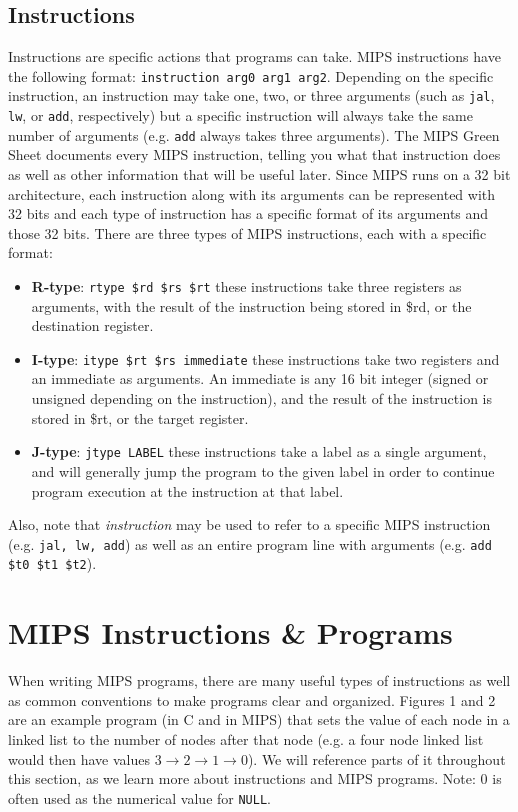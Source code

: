 \documentclass{article}
\begin{document}
\subsection{Instructions}
Instructions are specific actions that programs can take. MIPS instructions have the following format: \texttt{instruction arg0 arg1 arg2}. Depending on the specific instruction, an instruction may take one, two, or three arguments (such as \texttt{jal},  \texttt{lw}, or \texttt{add}, respectively) but a specific instruction will always take the same number of arguments (e.g.  \texttt{add} always takes three arguments). The MIPS Green Sheet documents every MIPS instruction, telling you what that instruction does as well as other information that will be useful later. Since MIPS runs on a 32 bit architecture, each instruction along with its arguments can be represented with 32 bits and each type of instruction has a specific format of its arguments and those 32 bits. There are three types of MIPS instructions, each with a specific format:

\begin{itemize}
\item \textbf{R-type}: \texttt{rtype \$rd \$rs \$rt} these instructions take three registers as arguments, with the result of the instruction being stored in \$rd, or the destination register.
\item \textbf{I-type}: \texttt{itype \$rt \$rs immediate} these instructions take two registers and an immediate as arguments. An immediate is any 16 bit integer (signed or unsigned depending on the instruction), and the result of the instruction is stored in \$rt, or the target register.
\item \textbf{J-type}: \texttt{jtype LABEL} these instructions take a label as a single argument, and will generally jump the program to the given label in order to continue program execution at the instruction at that label.
\end{itemize}

Also, note that \textit{instruction} may be used to refer to a specific MIPS instruction (e.g. \texttt{jal, lw, add}) as well as an entire program line with arguments (e.g. \texttt{add \$t0 \$t1 \$t2}).


\section{MIPS Instructions \& Programs}
When writing MIPS programs, there are many useful types of instructions as well as common conventions to make programs clear and organized. Figures 1 and 2 are an example program (in C and in MIPS) that sets the value of each node in a linked list to the number of nodes after that node (e.g. a four node linked list would then have values $3\rightarrow2\rightarrow1\rightarrow0$). We will reference parts of it throughout this section, as we learn more about instructions and MIPS programs. Note: $0$ is often used as the numerical value for \texttt{NULL}.
\end{document}

